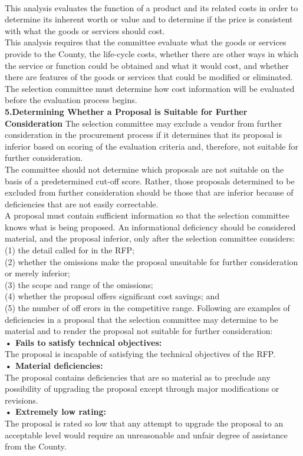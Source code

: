 \documentclass[12pt]{article}
\begin{document}
\\This analysis evaluates the function of a product and its
related costs in order to determine its inherent worth or value and to
determine if the price is consistent with what the goods or services should
cost. \\This analysis requires that the committee evaluate what the goods or
services provide to the County, the life-cycle costs, whether there are
other ways in which the service or function could be obtained and what it
would cost, and whether there are features of the goods or services that
could be modified or eliminated.
\\The selection committee must determine how cost information will be evaluated
before the evaluation process begins.
\\
\textbf{5.Determining Whether a Proposal is Suitable for Further Consideration}
The selection committee may exclude a vendor from further consideration in the
procurement process if it determines that its proposal is inferior based on scoring
of the evaluation criteria and, therefore, not suitable for further consideration.
\\The committee should not determine which proposals are not suitable on the
basis of a predetermined cut-off score. Rather, those proposals determined to be
excluded from further consideration should be those that are inferior because of
deficiencies that are not easily correctable.
\\A proposal must contain sufficient information so that the selection committee
knows what is being proposed. An informational deficiency should be considered
material, and the proposal inferior, only after the selection committee considers:
\\(1) the detail called for in the RFP; \\(2) whether the omissions make the proposal unsuitable for further consideration or merely inferior; \\(3) the scope and range of
the omissions; \\(4) whether the proposal offers significant cost savings; and \\(5)
the number of off erors in the competitive range. 
Following are examples of deficiencies in a proposal that the selection committee
may determine to be material and to render the proposal not suitable for further
consideration:\\
\textbf{• Fails to satisfy technical objectives:} \\The proposal is incapable of satisfying
the technical objectives of the RFP.\\
\textbf{• Material deficiencies:} \\The proposal contains deficiencies that are so
material as to preclude any possibility of upgrading the proposal except
through major modifications or revisions.\\
\textbf{• Extremely low rating:} \\The proposal is rated so low that any attempt to
upgrade the proposal to an acceptable level would require an
unreasonable and unfair degree of assistance from the County.
\end{document}

